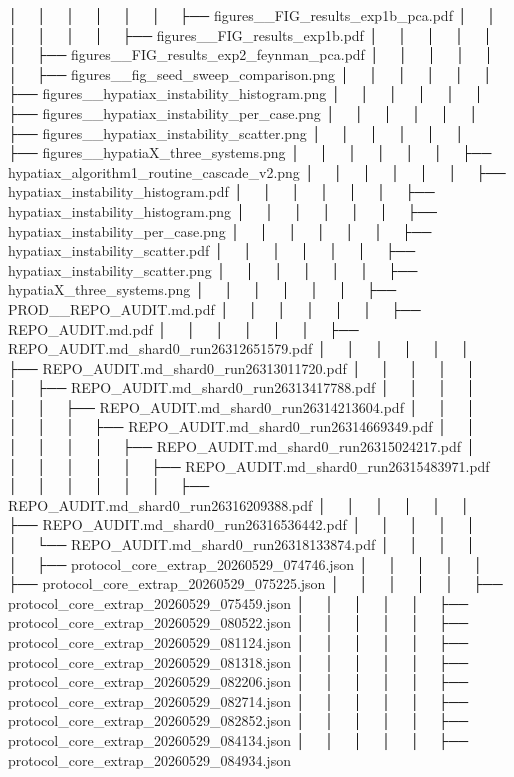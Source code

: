 │   │       │   │   │   │   ├── figures__FIG_results_exp1b_pca.pdf
│   │       │   │   │   │   ├── figures__FIG_results_exp1b.pdf
│   │       │   │   │   │   ├── figures__FIG_results_exp2_feynman_pca.pdf
│   │       │   │   │   │   ├── figures__fig_seed_sweep_comparison.png
│   │       │   │   │   │   ├── figures__hypatiax_instability_histogram.png
│   │       │   │   │   │   ├── figures__hypatiax_instability_per_case.png
│   │       │   │   │   │   ├── figures__hypatiax_instability_scatter.png
│   │       │   │   │   │   ├── figures__hypatiaX_three_systems.png
│   │       │   │   │   │   ├── hypatiax_algorithm1_routine_cascade_v2.png
│   │       │   │   │   │   ├── hypatiax_instability_histogram.pdf
│   │       │   │   │   │   ├── hypatiax_instability_histogram.png
│   │       │   │   │   │   ├── hypatiax_instability_per_case.png
│   │       │   │   │   │   ├── hypatiax_instability_scatter.pdf
│   │       │   │   │   │   ├── hypatiax_instability_scatter.png
│   │       │   │   │   │   ├── hypatiaX_three_systems.png
│   │       │   │   │   │   ├── PROD__REPO_AUDIT.md.pdf
│   │       │   │   │   │   ├── REPO_AUDIT.md.pdf
│   │       │   │   │   │   ├── REPO_AUDIT.md_shard0_run26312651579.pdf
│   │       │   │   │   │   ├── REPO_AUDIT.md_shard0_run26313011720.pdf
│   │       │   │   │   │   ├── REPO_AUDIT.md_shard0_run26313417788.pdf
│   │       │   │   │   │   ├── REPO_AUDIT.md_shard0_run26314213604.pdf
│   │       │   │   │   │   ├── REPO_AUDIT.md_shard0_run26314669349.pdf
│   │       │   │   │   │   ├── REPO_AUDIT.md_shard0_run26315024217.pdf
│   │       │   │   │   │   ├── REPO_AUDIT.md_shard0_run26315483971.pdf
│   │       │   │   │   │   ├── REPO_AUDIT.md_shard0_run26316209388.pdf
│   │       │   │   │   │   ├── REPO_AUDIT.md_shard0_run26316536442.pdf
│   │       │   │   │   │   └── REPO_AUDIT.md_shard0_run26318133874.pdf
│   │       │   │   │   ├── protocol_core_extrap_20260529_074746.json
│   │       │   │   │   ├── protocol_core_extrap_20260529_075225.json
│   │       │   │   │   ├── protocol_core_extrap_20260529_075459.json
│   │       │   │   │   ├── protocol_core_extrap_20260529_080522.json
│   │       │   │   │   ├── protocol_core_extrap_20260529_081124.json
│   │       │   │   │   ├── protocol_core_extrap_20260529_081318.json
│   │       │   │   │   ├── protocol_core_extrap_20260529_082206.json
│   │       │   │   │   ├── protocol_core_extrap_20260529_082714.json
│   │       │   │   │   ├── protocol_core_extrap_20260529_082852.json
│   │       │   │   │   ├── protocol_core_extrap_20260529_084134.json
│   │       │   │   │   ├── protocol_core_extrap_20260529_084934.json
